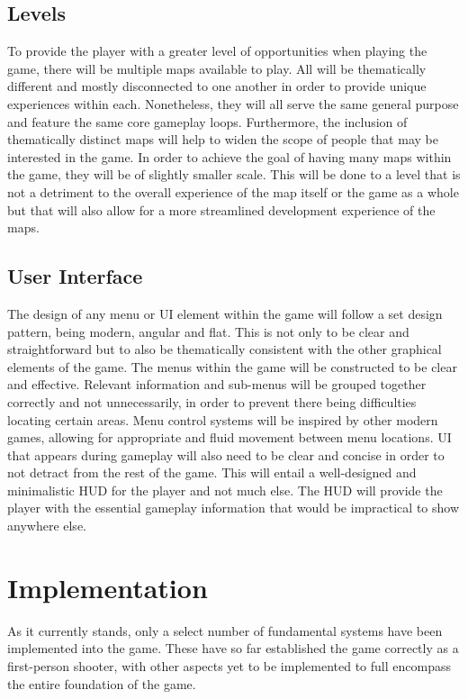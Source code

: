 \documentclass[11pt]{article}
\begin{document}
\subsection{Levels}
To provide the player with a greater level of opportunities when playing the game, there will be multiple maps available to play. All will be thematically different and mostly disconnected to one another in order to provide unique experiences within each. Nonetheless, they will all serve the same general purpose and feature the same core gameplay loops. Furthermore, the inclusion of thematically distinct maps will help to widen the scope of people that may be interested in the game. In order to achieve the goal of having many maps within the game, they will be of slightly smaller scale. This will be done to a level that is not a detriment to the overall experience of the map itself or the game as a whole but that will also allow for a more streamlined development experience of the maps.  \\

\subsection{User Interface}
The design of any menu or UI element within the game will follow a set design pattern, being modern, angular and flat. This is not only to be clear and straightforward but to also be thematically consistent with the other graphical elements of the game.
The menus within the game will be constructed to be clear and effective. Relevant information and sub-menus will be grouped together correctly and not unnecessarily, in order to prevent there being difficulties locating certain areas. Menu control systems will be inspired by other modern games, allowing for appropriate and fluid movement between menu locations. 
UI that appears during gameplay will also need to be clear and concise in order to not detract from the rest of the game. This will entail a well-designed and minimalistic HUD for the player and not much else. The HUD will provide the player with the essential gameplay information that would be impractical to show anywhere else. \\

\section{Implementation}
As it currently stands, only a select number of fundamental systems have been implemented into the game. These have so far established the game correctly as a first-person shooter, with other aspects yet to be implemented to full encompass the entire foundation of the game. \\
\end{document}
